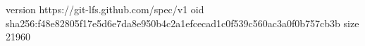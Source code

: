 version https://git-lfs.github.com/spec/v1
oid sha256:f48e82805f17e5d6e7da8e950b4c2a1efcecad1c0f539c560ac3a0f0b757cb3b
size 21960
